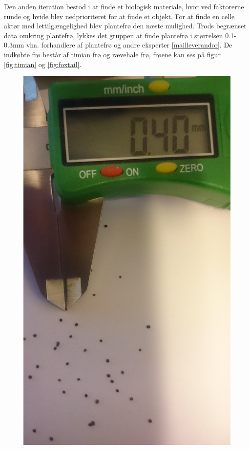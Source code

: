 Den anden iteration bestod i at finde et biologisk materiale, hvor ved faktorerne runde og hvide blev nedprioriteret for at finde et objekt. For at finde en celle aktør med lettilgængelighed blev plantefrø den næste mulighed. Trods begrænset data omkring plantefrø, lykkes det gruppen at finde plantefrø i størrelsen 0.1-0.3mm vha. forhandlere af plantefrø og andre eksperter \ref{mailleverandor}. De indkøbte frø består af timian frø og rævehale frø, frøene kan ses på figur \ref{fig:timian} og \ref{fig:foxtail}.

 \begin{figure}[htbp] \centering
\begin{minipage}[b]{0.48\textwidth} \centering
\includegraphics[width=1.00\textwidth]{billeder/Hovedrapport/timian.jpg} %

\end{minipage}
\end{figure}
